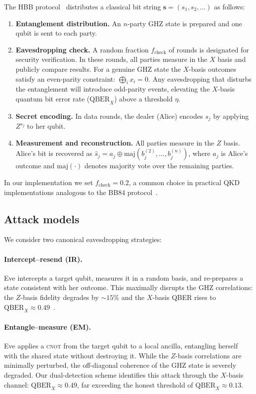 \documentclass[aip, amsmath, amssymb, preprint, longbibliography]{revtex4-2}
\newcommand{\cnot}{\textsc{cnot}}
\newcommand{\qber}{\text{QBER}}
\begin{document}
The HBB protocol~\cite{Hillery1999} distributes a classical bit string
$\mathbf{s}=(s_1,s_2,\ldots)$ as follows:

\begin{enumerate}
\item \textbf{Entanglement distribution.} An $n$-party GHZ state is
      prepared and one qubit is sent to each party.
\item \textbf{Eavesdropping check.} A random fraction $f_{\text{check}}$
      of rounds is designated for security verification. In these rounds,
      all parties measure in the $X$ basis and publicly compare results.
      For a genuine GHZ state the $X$-basis outcomes satisfy an even-parity
      constraint: $\bigoplus_i x_i = 0$. Any eavesdropping that
      disturbs the entanglement will introduce odd-parity events, elevating
      the $X$-basis quantum bit error rate ($\qber_X$) above a threshold
      $\eta$.
\item \textbf{Secret encoding.} In data rounds, the dealer (Alice)
      encodes $s_j$ by applying $Z^{s_j}$ to her qubit.
\item \textbf{Measurement and reconstruction.} All parties measure in the
      $Z$ basis. Alice's bit is recovered as
      $\hat{s}_j = a_j \oplus \text{maj}(b_j^{(2)},\ldots,b_j^{(n)})$,
      where $a_j$ is Alice's outcome and $\text{maj}(\cdot)$ denotes
      majority vote over the remaining parties.
\end{enumerate}

In our implementation we set $f_{\text{check}}=0.2$, a common choice in
practical QKD implementations analogous to the BB84
protocol~\cite{Bennett1984}.

\subsection{Attack models}\label{sec:attacks}

We consider two canonical eavesdropping strategies:

\paragraph{Intercept--resend (IR).}
Eve intercepts a target qubit, measures it in a random basis, and
re-prepares a state consistent with her outcome. This maximally disrupts
the GHZ correlations: the $Z$-basis fidelity degrades by
$\sim\!15\%$ and the $X$-basis QBER rises to
$\qber_X\approx0.49$~\cite{Hillery1999}.

\paragraph{Entangle--measure (EM).}
Eve applies a \cnot{} from the target qubit to a local ancilla, entangling
herself with the shared state without destroying it. While the $Z$-basis
correlations are minimally perturbed, the off-diagonal coherence of the
GHZ state is severely degraded. Our dual-detection scheme identifies this
attack through the $X$-basis channel:
$\qber_X\approx0.49$, far exceeding the honest threshold of
$\qber_X\approx0.13$.
\end{document}
